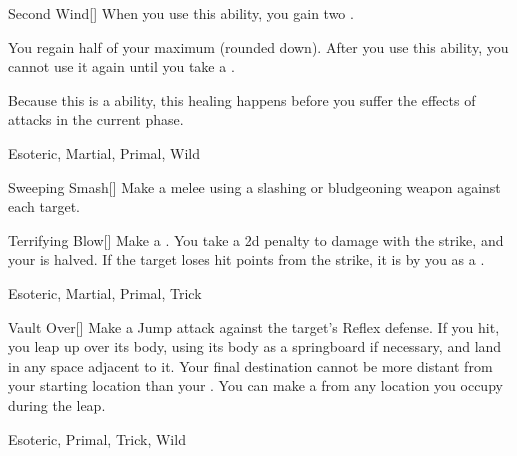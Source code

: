 \lowercase{\hypertarget{maneuver:Second Wind}{}}\label{maneuver:Second Wind}
\hypertarget{maneuver:Second Wind}{}
\begin{freeability}[Rank 4]{Second Wind}[]
When you use this ability, you gain two .

You regain half of your maximum  (rounded down).
After you use this ability, you cannot use it again until you take a .

Because this is a  ability, this healing happens before you suffer the effects of attacks in the current phase.


 Esoteric, Martial, Primal, Wild
\end{freeability}
\vspace{0.25em}



\lowercase{\hypertarget{maneuver:Sweeping Smash}{}}\label{maneuver:Sweeping Smash}
\hypertarget{maneuver:Sweeping Smash}{}
\begin{freeability}[Rank 4]{Sweeping Smash}[]
Make a melee  using a slashing or bludgeoning weapon against each target.


\end{freeability}
\vspace{0.25em}



\lowercase{\hypertarget{maneuver:Terrifying Blow}{}}\label{maneuver:Terrifying Blow}
\hypertarget{maneuver:Terrifying Blow}{}
\begin{freeability}[Rank 4]{Terrifying Blow}[]
Make a .
You take a \minus2d penalty to damage with the strike, and your  is halved.
If the target loses hit points from the strike, it is  by you as a .


 Esoteric, Martial, Primal, Trick
\end{freeability}
\vspace{0.25em}



\lowercase{\hypertarget{maneuver:Vault Over}{}}\label{maneuver:Vault Over}
\hypertarget{maneuver:Vault Over}{}
\begin{freeability}[Rank 4]{Vault Over}[]
Make a Jump attack against the target's Reflex defense.
If you hit, you leap up over its body, using its body as a springboard if necessary, and land in any space adjacent to it.
Your final destination cannot be more distant from your starting location than your .
You can make a  from any location you occupy during the leap.


 Esoteric, Primal, Trick, Wild
\end{freeability}
\vspace{0.25em}


